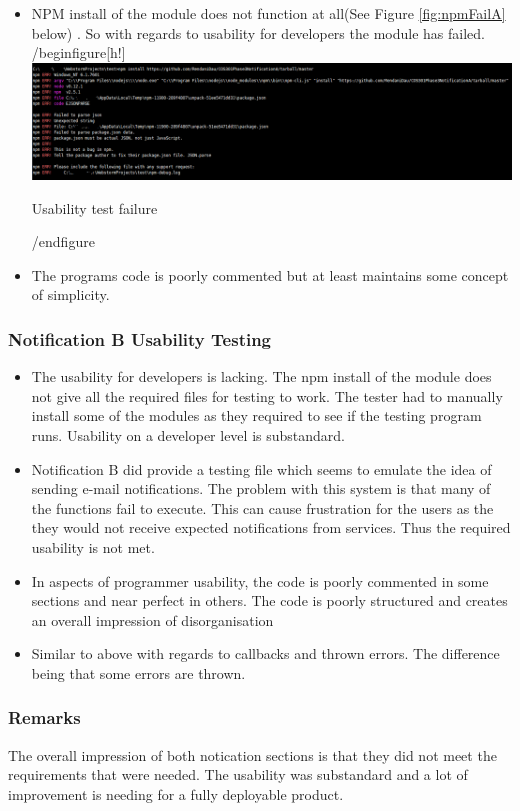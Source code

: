 \begin{itemize}
	\item NPM install of the module does not function at all(See Figure \ref{fig:npmFailA} below) . So with regards to usability for developers the module has failed.
	/begin{figure}[h!]
		\includegraphics[width=\linewidth]{../images/npmfail.png}
		\caption{Usability test failure}
		\label{fig:npmFailA}
	/end{figure}
	\item The programs code is poorly commented but at least maintains some concept of simplicity.
\end{itemize}
\subsubsection{Notification B Usability Testing}
\begin{itemize}
	\item The usability for developers is lacking. The npm install of the module does not give all the required files for testing to work. The tester had to manually install some of the modules as they required to see if the testing program runs. Usability on a developer level is substandard.
	\item Notification B did provide a testing file which seems to emulate the idea of sending e-mail notifications. The problem with this system is that many of the functions fail to execute. This can cause frustration for the users as the they would not receive expected notifications from services. Thus the required usability is not met.
	\item In aspects of programmer usability, the code is poorly commented in some sections and near perfect in others. The code is poorly structured and creates an overall impression of disorganisation
	\item Similar to above with regards to callbacks and thrown errors. The difference being that some errors are thrown. 
\end{itemize}
\subsubsection{Remarks}
The overall impression of both notication sections is that they did not meet the requirements that were needed. The usability was substandard and a lot of improvement is needing for a fully deployable product.
